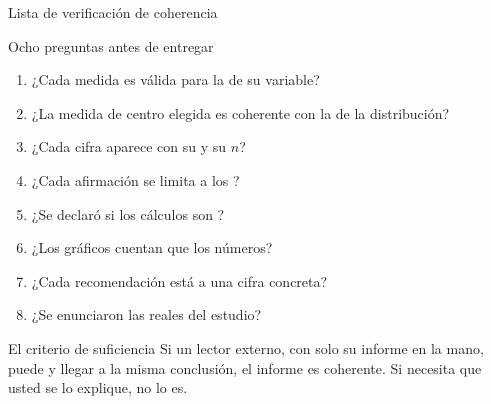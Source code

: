 \documentclass[aspectratio=169,10pt]{beamer}
\begin{document}
\begin{frame}{Lista de verificación de coherencia}
  \footnotesize
  \begin{block}{Ocho preguntas antes de entregar}
    \scriptsize
    \begin{enumerate}\setlength{\itemsep}{-0.04cm}
      \item ¿Cada medida es válida para la  de su variable?
      \item ¿La medida de centro elegida es coherente con la  de
            la distribución?
      \item ¿Cada cifra aparece con su  y su $n$?
      \item ¿Cada afirmación se limita a los ?
      \item ¿Se declaró si los cálculos son ?
      \item ¿Los gráficos cuentan  que los números?
      \item ¿Cada recomendación está  a una cifra concreta?
      \item ¿Se enunciaron las  reales del estudio?
    \end{enumerate}
  \end{block}

  \vspace{-0.05cm}
  \begin{alertblock}{El criterio de suficiencia}
    \tiny
    Si un lector externo, con solo su informe en la mano, puede
     y llegar a la misma conclusión, el
    informe es coherente. Si necesita que usted se lo explique, no lo es.
  \end{alertblock}
\end{frame}
\end{document}
